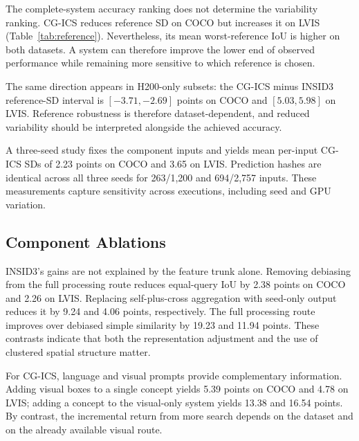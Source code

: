 The complete-system accuracy ranking does not determine the variability ranking. CG-ICS reduces reference SD on COCO but increases it on LVIS (Table~\ref{tab:reference}). Nevertheless, its mean worst-reference IoU is higher on both datasets. A system can therefore improve the lower end of observed performance while remaining more sensitive to which reference is chosen.

The same direction appears in H200-only subsets: the CG-ICS minus INSID3 reference-SD interval is $[-3.71,-2.69]$ points on COCO and $[5.03,5.98]$ on LVIS. Reference robustness is therefore dataset-dependent, and reduced variability should be interpreted alongside the achieved accuracy.

A three-seed study fixes the component inputs and yields mean per-input CG-ICS SDs of 2.23 points on COCO and 3.65 on LVIS. Prediction hashes are identical across all three seeds for 263/1,200 and 694/2,757 inputs. These measurements capture sensitivity across executions, including seed and GPU variation.

\subsection{Component Ablations}
INSID3's gains are not explained by the feature trunk alone. Removing debiasing from the full processing route reduces equal-query IoU by 2.38 points on COCO and 2.26 on LVIS. Replacing self-plus-cross aggregation with seed-only output reduces it by 9.24 and 4.06 points, respectively. The full processing route improves over debiased simple similarity by 19.23 and 11.94 points. These contrasts indicate that both the representation adjustment and the use of clustered spatial structure matter.

For CG-ICS, language and visual prompts provide complementary information. Adding visual boxes to a single concept yields 5.39 points on COCO and 4.78 on LVIS; adding a concept to the visual-only system yields 13.38 and 16.54 points. By contrast, the incremental return from more search depends on the dataset and on the already available visual route.

